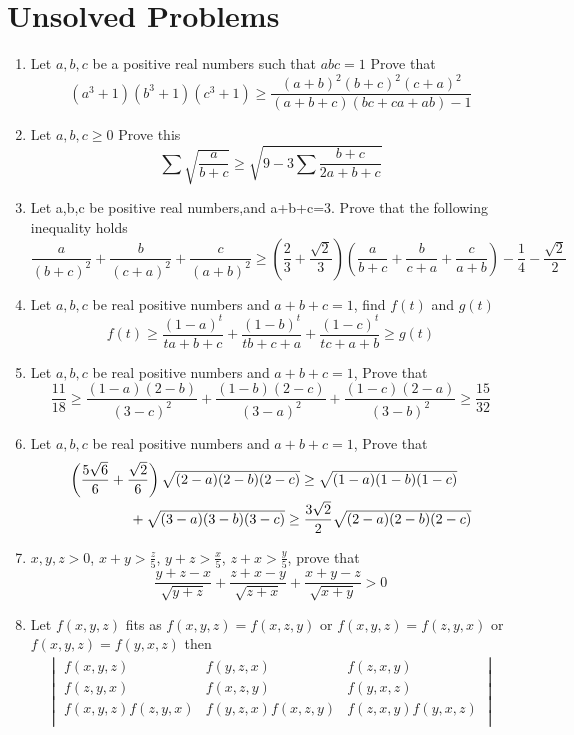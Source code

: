 \documentclass{report}
\begin{document}
\section{Unsolved Problems}

\begin{enumerate}
	\item Let $ a,b,c$ be a positive real numbers such that $ abc = 1$ Prove that$$ (a^3 + 1)(b^3 + 1)(c^3 + 1) \geq \frac {(a + b)^2(b + c)^2(c + a)^2}{(a + b + c)(bc + ca + ab) - 1}$$
	
	\item Let $ a,b,c\ge 0$ Prove this$$\sum\sqrt {\frac {a}{b + c}}\geq\sqrt {9 - 3\sum\frac {b + c}{2a + b + c}}$$
	\item Let a,b,c be positive real numbers,and a+b+c=3. Prove that the following inequality holds$$ \frac {a}{(b + c)^2} + \frac {b}{(c + a)^2} + \frac {c}{(a + b)^2}\geq \left( \frac {2}{3} + \frac {\sqrt {2}}{3}\right) \left( \frac {a}{b + c} + \frac {b}{c + a} + \frac {c}{a + b}\right)  - \frac {1}{4} - \frac {\sqrt {2}}{2}$$
	\item Let $ a,b,c$ be real positive numbers and $ a+b+c=1$, find $f(t)$ and $g(t)$ $$ f(t) \geq \frac {(1 - a)^t}{ta + b + c} + \frac {(1 - b)^t}{tb + c + a} + \frac {(1 - c)^t}{tc + a + b} \geq g(t)$$
	\item Let $ a,b,c$ be real positive numbers and $ a + b + c = 1$, Prove that$$ \frac {11}{18} \geq \frac {(1 - a)(2 - b)}{(3 - c)^2} + \frac {(1 - b)(2 - c)}{(3 - a)^2} + \frac {(1 - c)(2 - a)}{(3 - b)^2} \geq \frac {15}{32}$$
	\item Let $ a,b,c$ be real positive numbers and $ a + b + c = 1$, Prove that$$ \splitdfrac{\left( \dfrac {5\sqrt {6}}{6} + \dfrac {\sqrt {2}}{6}\right) \sqrt {(2 - a)(2 - b)(2 - c)} \geq \sqrt {(1 - a)(1 - b)(1 - c)}}{+ \sqrt {(3 - a)(3 - b)(3 - c)} \geq \dfrac {3\sqrt {2}}{2}\sqrt {(2 - a)(2 - b)(2 - c)}} $$
	\item $x,y,z>0$, $x+y>\frac{z}{5}$, $y+z>\frac{x}{5}$, $z+x>\frac{y}{5}$, prove that\[{\frac {y+z-x}{\sqrt {y+z}}}+{\frac {z+x-y}{\sqrt {z+x}}}+{\frac {x+y-z}{\sqrt{x+y}}}>0\]
	\item Let $f(x,y,z)$ fits as $f(x,y,z)=f(x,z,y)$ or $f(x,y,z)=f(z,y,x)$	or $f(x,y,z)=f(y,x,z)$ then 
	\begin{align*}
	\begin{vmatrix}
	f(x,y,z) & f(y,z,x) & f(z,x,y)\\
	f(z,y,x) & f(x,z,y) & f(y,x,z)\\
	f(x,y,z)f(z,y,x) & f(y,z,x)f(x,z,y) & f(z,x,y)f(y,x,z)\\

\end{vmatrix}
\end{align*}
\end{enumerate}
\end{document}
